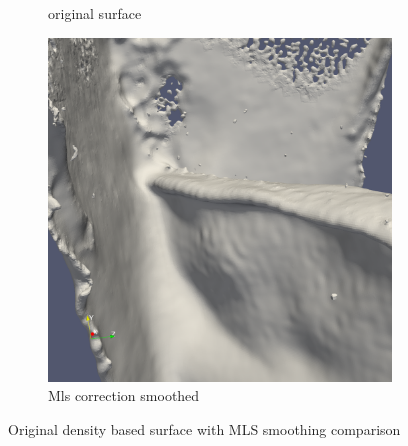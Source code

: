 \begin{figure}
\begin{center}
\begin{subfigure}[b]{0.47\textwidth}
			\caption{original surface}
		\end{subfigure}
		\begin{subfigure}[b]{0.47\textwidth}
			\includegraphics[width=\textwidth]{figures/DDMMls2.png}
			\caption{Mls correction smoothed}
		\end{subfigure}
	\end{center}
	\caption{Original density based surface with MLS smoothing comparison} \label{fig:db_mls_reconstruction1}
\end{figure}
